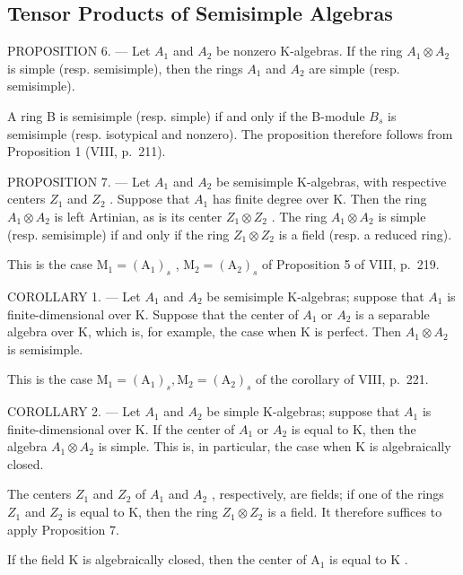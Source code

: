 \subsection{Tensor Products of Semisimple Algebras}

PROPOSITION 6. --- Let \(A_{1}\) and \(A_{2}\) be nonzero K-algebras. If the ring \(A_{1} \otimes A_{2}\) is simple (resp. semisimple), then the rings \(A_{1}\) and \(A_{2}\) are simple (resp. semisimple).

A ring B is semisimple (resp. simple) if and only if the B-module \(B_{s}\) is semisimple (resp. isotypical and nonzero). The proposition therefore follows from Proposition 1 (VIII, p.~211).

PROPOSITION 7. --- Let \(A_{1}\) and \(A_{2}\) be semisimple K-algebras, with respective centers \(Z_{1}\) and \(Z_{2}\) . Suppose that \(A_{1}\) has finite degree over K. Then the ring \(A_{1} \otimes A_{2}\) is left Artinian, as is its center \(Z_{1} \otimes Z_{2}\) . The ring \(A_{1} \otimes A_{2}\) is simple (resp. semisimple) if and only if the ring \(Z_{1} \otimes Z_{2}\) is a field (resp. a reduced ring).

This is the case \(\mathrm{M}_1 = (\mathrm{A}_1)_s\) , \(\mathrm{M}_2 = (\mathrm{A}_2)_s\) of Proposition 5 of VIII, p.~219.

COROLLARY 1. --- Let \(A_{1}\) and \(A_{2}\) be semisimple K-algebras; suppose that \(A_{1}\) is finite-dimensional over K. Suppose that the center of \(A_{1}\) or \(A_{2}\) is a separable algebra over K, which is, for example, the case when K is perfect. Then \(A_{1} \otimes A_{2}\) is semisimple.

This is the case \(\mathrm{M}_{1}=(\mathrm{A}_{1})_{s},\mathrm{M}_{2}=(\mathrm{A}_{2})_{s}\) of the corollary of VIII, p.~221.

COROLLARY 2. --- Let \(A_{1}\) and \(A_{2}\) be simple K-algebras; suppose that \(A_{1}\) is finite-dimensional over K. If the center of \(A_{1}\) or \(A_{2}\) is equal to K, then the algebra \(A_{1} \otimes A_{2}\) is simple. This is, in particular, the case when K is algebraically closed.

The centers \(Z_{1}\) and \(Z_{2}\) of \(A_{1}\) and \(A_{2}\) , respectively, are fields; if one of the rings \(Z_{1}\) and \(Z_{2}\) is equal to K, then the ring \(Z_{1} \otimes Z_{2}\) is a field. It therefore suffices to apply Proposition 7.

If the field \(\mathrm{K}\) is algebraically closed, then the center of \(\mathrm{A}_1\) is equal to \(\mathrm{K}\) .
\relax{}

